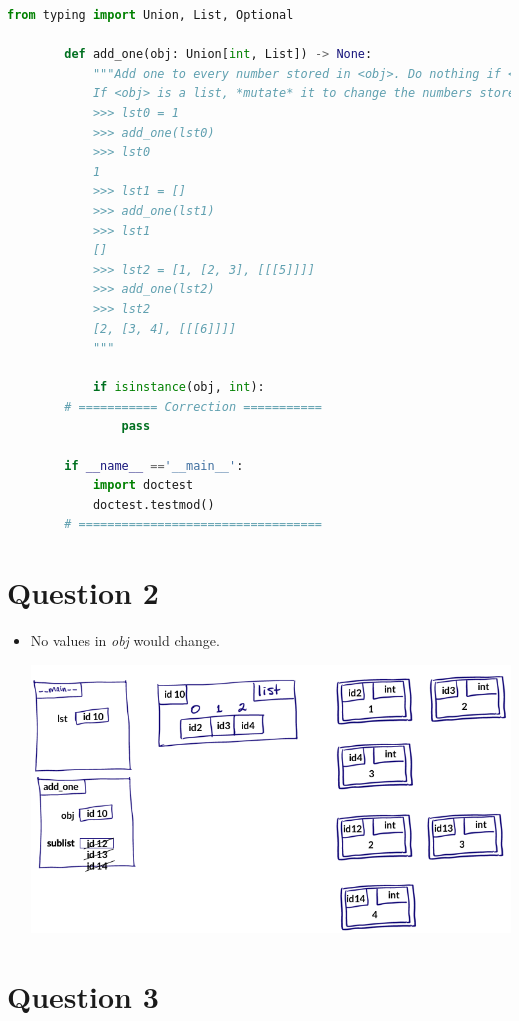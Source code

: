 \documentclass[12pt]{article}
\begin{document}
\begin{itemize}
\begin{mdframed}
        \begin{lstlisting}[language=python,caption={worksheet\_17\_q1\_solution.py}]
        from typing import Union, List, Optional

        def add_one(obj: Union[int, List]) -> None:
            """Add one to every number stored in <obj>. Do nothing if <obj> is an int.
            If <obj> is a list, *mutate* it to change the numbers stored.
            >>> lst0 = 1
            >>> add_one(lst0)
            >>> lst0
            1
            >>> lst1 = []
            >>> add_one(lst1)
            >>> lst1
            []
            >>> lst2 = [1, [2, 3], [[[5]]]]
            >>> add_one(lst2)
            >>> lst2
            [2, [3, 4], [[[6]]]]
            """

            if isinstance(obj, int):
        # =========== Correction ===========
                pass

        if __name__ =='__main__':
            import doctest
            doctest.testmod()
        # ==================================
        \end{lstlisting}
    \end{mdframed}
\end{itemize}

\section*{Question 2}
\begin{itemize}
    \item No values in \textit{obj} would change.

    \begin{center}
    \includegraphics[width=0.8 \linewidth]{images/worksheet_17_q2_solution.png}
    \end{center}
\end{itemize}

\section*{Question 3}
\end{document}

